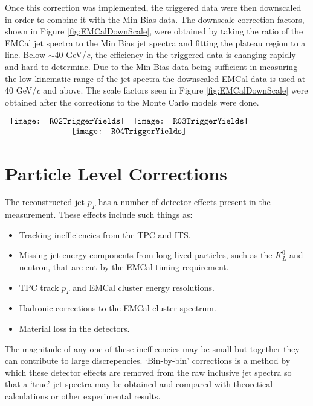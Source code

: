 Once this correction was implemented, the triggered data were then downscaled in order to combine it with the Min Bias data.  The downscale correction factors, shown in Figure \ref{fig:EMCalDownScale}, were obtained by taking the ratio of the EMCal jet spectra to the Min Bias jet spectra and fitting the plateau region to a line.  Below $\sim$40 GeV/\textit{c}, the efficiency in the triggered data is changing rapidly and hard to determine.  Due to the Min Bias data being sufficient in measuring the low kinematic range of the jet spectra the downscaled EMCal data is used at 40 GeV/\textit{c} and above.  The scale factors seen in Figure \ref{fig:EMCalDownScale} were obtained after the corrections to the Monte Carlo models were done.


\begin{figure*}[t!]
$\begin{array}{rl}
    \texttt{[image: R02TriggerYields]} &
    \texttt{[image: R03TriggerYields]}\\
    \multicolumn{2}{c}{\texttt{[image: R04TriggerYields]}}
\end{array}$
\caption[EMCal triggered data correction factors for R=0.2, R=0.3, and R=0.4 jets.]{\label{fig:EMCalDownScale}EMCal triggered data correction factors for R=0.2, R=0.3, and R=0.4 jets.}
\end{figure*}
 

\section{Particle Level Corrections}

The reconstructed jet $p_{T}$ has a number of detector effects present in the measurement.  These effects include such things as:

\begin{itemize}
\item Tracking inefficiencies from the TPC and ITS.
\item Missing jet energy components from long-lived particles, such as the $K^{0}_{L}$ and neutron, that are cut by the EMCal timing requirement.
\item TPC track $p_{T}$ and EMCal cluster energy resolutions.
\item Hadronic corrections to the EMCal cluster spectrum.
\item Material loss in the detectors.
\end{itemize}

\noindent
The magnitude of any one of these inefficencies may be small but together they can contribute to large discrepencies.  `Bin-by-bin' corrections is a method by which these detector effects are removed from the raw inclusive jet spectra so that a `true' jet spectra may be obtained and compared with theoretical calculations or other experimental results.  

